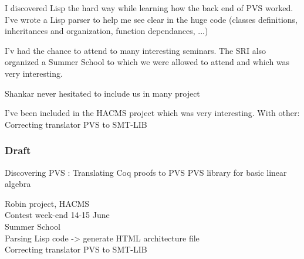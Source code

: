 \documentclass[12pt,a4paper,titlepage]{article}
\begin{document}
I discovered Lisp the hard way while learning how the back end of PVS worked. I've wrote a Lisp parser to help me see clear in the huge code (classes definitions, inheritances and organization, function dependances, ...)

I'v had the chance to attend to many interesting seminars. The SRI also organized a Summer School to which we were allowed to attend and which was very interesting.

Shankar never hesitated to include us in many project

I've been included in the HACMS project which was very interesting.
With other:
Correcting translator PVS to SMT-LIB




\subsubsection*{Draft}
Discovering PVS :
Translating Coq proofs to PVS
PVS library for basic linear algebra

Robin project, HACMS \\
Contest week-end 14-15 June \\
Summer School \\
Parsing Lisp code -> generate HTML architecture file\\
Correcting translator PVS to SMT-LIB
\cite{pavol}





\end{document}
